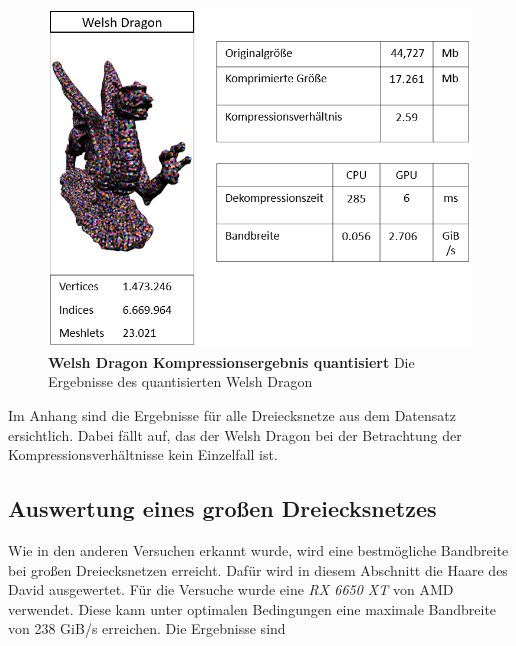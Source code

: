 \begin{figure}[htb]
  \centering  
  \includegraphics[scale=0.7]{Bilder/welshdragon_quantized_ergebniss.png}
  \caption[Welsh Dragon Kompressionsergebnis quantisiert]{\textbf{Welsh Dragon Kompressionsergebnis quantisiert} Die Ergebnisse des quantisierten Welsh Dragon }
  \label{fig:quantized_welsh_dragon}
\end{figure}

Im Anhang sind die Ergebnisse für alle Dreiecksnetze aus dem Datensatz ersichtlich.
Dabei fällt auf, das der Welsh Dragon bei der Betrachtung der Kompressionsverhältnisse kein Einzelfall ist.

\subsection{Auswertung eines großen Dreiecksnetzes}
\label{subsec:auswertung3}
Wie in den anderen Versuchen erkannt wurde, wird eine bestmögliche Bandbreite bei großen Dreiecksnetzen erreicht.
Dafür wird in diesem Abschnitt die Haare des David ausgewertet.
Für die Versuche wurde eine \textit{RX 6650 XT} von AMD verwendet.
Diese kann unter optimalen Bedingungen eine maximale Bandbreite von 238 GiB/s erreichen.
Die Ergebnisse sind 